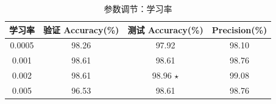 \begin{table}[htbp]\centering
\caption{参数调节：学习率}
\label{tab:sweeplr}
\begin{tabular}{cccc}
\toprule
学习率 & 验证 Accuracy(\%) & 测试 Accuracy(\%) & Precision(\%) \\
\midrule
0.0005 & 98.26 & 97.92 & 98.10 \\
0.001 & 98.61 & 98.61 & 98.76 \\
0.002 & 98.61 & 98.96 $\star$ & 99.08 \\
0.005 & 96.53 & 98.61 & 98.76 \\
\bottomrule
\end{tabular}
\end{table}
